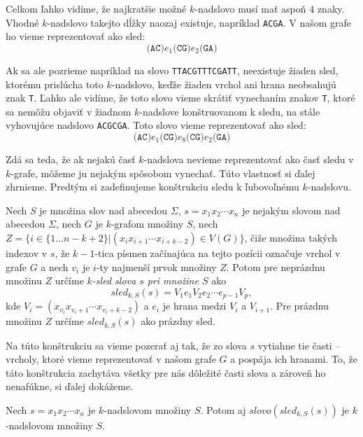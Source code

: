 Celkom ľahko vidíme, že najkratšie možné $k$-nadslovo musí mať aspoň $4$ znaky. Vhodné $k$-nadslovo takejto
dĺžky naozaj existuje, napríklad \verb_ACGA_. V našom grafe ho vieme reprezentovať ako sled:
$$\texttt{(AC)} e_1 \texttt{(CG)} e_2 \texttt{(GA)}$$

Ak sa ale pozrieme napríklad na slovo \verb_TTACGTTTCGATT_, neexistuje žiaden sled, ktorému prislúcha toto $k$-nadslovo,
keďže žiaden vrchol ani hrana neobsahujú znak \verb_T_. Ľahko ale vidíme, že toto slovo vieme skrátiť
vynechaním znakov \verb_T_, ktoré sa nemôžu objaviť v žiadnom $k$-nadslove konštruovanom k sledu,
na stále vyhovujúce nadslovo \verb_ACGCGA_. Toto slovo vieme reprezentovať ako sled:
$$\texttt{(AC)} e_1 \texttt{(CG)} e_8 \texttt{(CG)} e_2 \texttt{(GA)}$$

Zdá sa teda, že ak nejakú časť $k$-nadslova nevieme reprezentovať ako časť sledu v $k$-grafe, môžeme ju
nejakým spôsobom vynechať. Túto vlastnosť si ďalej zhrnieme. Predtým si zadefinujeme konštrukciu sledu k
ľubovoľnému $k$-nadslovu.

\begin{defn}
    Nech $S$ je množina slov nad abecedou $\Sigma$, $s = x_1 x_2 \cdots x_n$ je nejakým slovom nad abecedou $\Sigma$,
    nech $G$ je $k$-grafom množiny $S$, nech \\
    $Z = \{ i \in \{1 \ldots n - k + 2 \} | (x_i x_{i+1} \cdots x_{i+k-2}) \in V(G) \}$, čiže množina takých indexov v $s$, že
    $k-1$-tica písmen začínajúca na tejto pozícii označuje vrchol v grafe $G$
    a nech $v_i$ je $i$-ty najmenší prvok množiny $Z$. Potom pre neprázdnu množinu $Z$ určíme \textit{$k$-sled slova $s$ pri množine $S$} ako
    $$sled_{k,S}(s) = V_1 e_1 V_2 e_2 \cdots e_{p-1} V_p,$$
    kde $V_i = (x_{v_i} x_{v_i + 1} \cdots x_{v_i + k - 2})$ a $e_i$ je hrana medzi $V_i$ a $V_{i+1}$. Pre prázdnu
    množinu $Z$ určíme $sled_{k, S}(s)$ ako prázdny sled.
\end{defn}

Na túto konštrukciu sa vieme pozerať aj tak, že zo slova $s$ vytiahne tie časti -- vrcholy, ktoré vieme reprezentovať
v našom grafe $G$ a pospája ich hranami. To, že táto konštrukcia zachytáva všetky pre nás dôležité časti slova
a zároveň ho nenafúkne, si ďalej dokážeme.

\begin{veta}
    Nech $s = x_1 x_2 \cdots x_n$ je $k$-nadslovom množiny $S$. Potom aj $slovo(sled_{k,S}(s))$ je
    $k$-nadslovom množiny $S$.
\end{veta}


